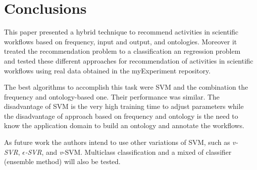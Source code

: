 \documentclass{sig-alternate-05-2015}
\begin{document}
\section{Conclusions}\label{CONCLUSOES}
This paper presented a hybrid technique to recommend activities in scientific workflows based on frequency, input and output, and ontologies. Moreover it treated the recommendation problem to a classification an regression problem and tested these different approaches for recommendation of activities in scientific workflows using real data obtained in the myExperiment repository.

The best algorithms to accomplish this task were SVM and the combination the frequency and ontology-based one. Their performance was similar. The disadvantage of SVM is the very high training time to adjust parameters while the disadvantage of approach based on frequency and ontology is the need to know the application domain to build an ontology and annotate the workflows.

As future work the authors intend to use other variations of SVM, such as \emph{v-SVR}, \emph{\(\epsilon\)-SVR}, and \emph{v}-SVM. Multiclass classification and a mixed of classifier (ensemble method) will also be tested.



 

\balancecolumns
\end{document}
